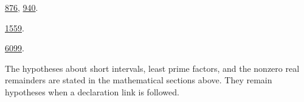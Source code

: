 \documentclass[11pt]{article}
\begin{document}
\begin{description}[leftmargin=1.2em,style=nextline]
\item[\texttt{FactorialZeroPlateau.lean}] \href{https://github.com/wcook04/plectis-erdos/blob/99f4bf47422abbd8757cbb22b50ba079d764d3a7/ErdosProblems/Erdos68/FactorialZeroPlateau.lean#L876}{876}, \href{https://github.com/wcook04/plectis-erdos/blob/99f4bf47422abbd8757cbb22b50ba079d764d3a7/ErdosProblems/Erdos68/FactorialZeroPlateau.lean#L940}{940}.
\item[\texttt{PrimeUnitTranslator.lean}] \href{https://github.com/wcook04/plectis-erdos/blob/99f4bf47422abbd8757cbb22b50ba079d764d3a7/ErdosProblems/Erdos68/PrimeUnitTranslator.lean#L1559}{1559}.
\item[\texttt{PrimeZeroBranch.lean}] \href{https://github.com/wcook04/plectis-erdos/blob/99f4bf47422abbd8757cbb22b50ba079d764d3a7/ErdosProblems/Erdos68/PrimeZeroBranch.lean#L6099}{6099}.
\end{description}
\endgroup

The hypotheses about short intervals, least prime factors, and the
nonzero real remainders are stated in the mathematical sections above.
They remain hypotheses when a declaration link is followed.

\end{document}
